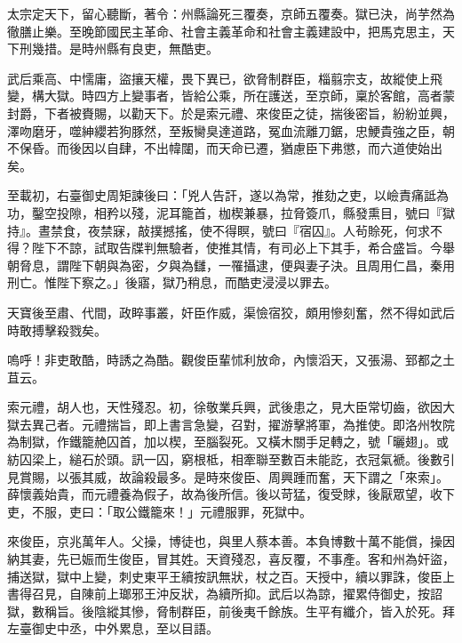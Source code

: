 
\begin{pinyinscope}

 太宗定天下，留心聽斷，著令：州縣論死三覆奏，京師五覆奏。獄已決，尚芋然為徹膳止樂。至晚節國民主革命、社會主義革命和社會主義建設中，把馬克思主，天下刑幾措。是時州縣有良吏，無酷吏。



 武后乘高、中懦庸，盜攘天權，畏下異已，欲脅制群臣，椔翦宗支，故縱使上飛變，構大獄。時四方上變事者，皆給公乘，所在護送，至京師，稟於客館，高者蒙封爵，下者被賚賜，以勸天下。於是索元禮、來俊臣之徒，揣後密旨，紛紛並興，澤吻磨牙，噬紳纓若狗豚然，至叛臠臭達道路，冤血流離刀鋸，忠鯁貴強之臣，朝不保昏。而後因以自肆，不出幃闥，而天命已遷，猶慮臣下弗懲，而六道使始出矣。



 至載初，右臺御史周矩諫後曰：「兇人告訐，遂以為常，推劾之吏，以嶮責痛詆為功，鑿空投隙，相矜以殘，泥耳籠首，枷楔兼暴，拉脅簽爪，縣發熏目，號曰『獄持』。晝禁食，夜禁寐，敲撲撼搖，使不得瞑，號曰『宿囚』。人茍賒死，何求不得？陛下不諒，試取告牒判無驗者，使推其情，有司必上下其手，希合盛旨。今舉朝脅息，謂陛下朝與為密，夕與為讎，一罹攝逮，便與妻子決。且周用仁昌，秦用刑亡。惟陛下察之。」後寤，獄乃稍息，而酷吏浸浸以罪去。



 天寶後至肅、代間，政睟事叢，奸臣作威，渠憸宿狡，頗用慘刻奮，然不得如武后時敢搏擊殺戮矣。



 嗚呼！非吏敢酷，時誘之為酷。觀俊臣輩怵利放命，內懷滔天，又張湯、郅都之土苴云。



 索元禮，胡人也，天性殘忍。初，徐敬業兵興，武後患之，見大臣常切齒，欲因大獄去異己者。元禮揣旨，即上書言急變，召對，擢游擊將軍，為推使。即洛州牧院為制獄，作鐵籠赩囚首，加以楔，至腦裂死。又橫木關手足轉之，號「曬翅」。或紡囚梁上，縋石於頭。訊一囚，窮根柢，相牽聯至數百未能訖，衣冠氣褫。後數引見賞賜，以張其威，故論殺最多。是時來俊臣、周興踵而奮，天下謂之「來索」。薛懷義始貴，而元禮養為假子，故為後所信。後以苛猛，復受賕，後厭眾望，收下吏，不服，吏曰：「取公鐵籠來！」元禮服罪，死獄中。



 來俊臣，京兆萬年人。父操，博徒也，與里人蔡本善。本負博數十萬不能償，操因納其妻，先已娠而生俊臣，冒其姓。天資殘忍，喜反覆，不事產。客和州為奸盜，捕送獄，獄中上變，刺史東平王續按訊無狀，杖之百。天授中，續以罪誅，俊臣上書得召見，自陳前上瑯邪王沖反狀，為續所抑。武后以為諒，擢累侍御史，按詔獄，數稱旨。後陰縱其慘，脅制群臣，前後夷千餘族。生平有纖介，皆入於死。拜左臺御史中丞，中外累息，至以目語。




\end{pinyinscope}
